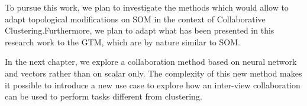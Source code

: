 	To pursue this work, we plan to investigate the methods which would allow to adapt topological modifications on SOM in the context of Collaborative Clustering.\@ Furthermore, we plan to adapt what has been presented in this research work to the GTM, which are by nature similar to SOM.\@

In the next chapter, we explore a collaboration method based on neural network and vectors rather than on scalar only. The complexity of this new method makes it possible to introduce a new use case to explore how an inter-view collaboration can be used to perform tasks different from clustering.

